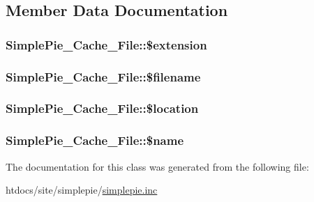 \subsection{Member Data Documentation}
\hypertarget{class_simple_pie___cache___file_a2628f1d1c5faca94a33734dd8315366a}{
\subsubsection[{\$extension}]{\setlength{\rightskip}{0pt plus 5cm}Simple\-Pie\-\_\-\-Cache\-\_\-\-File\-::\$extension}}\label{class_simple_pie___cache___file_a2628f1d1c5faca94a33734dd8315366a}
\hypertarget{class_simple_pie___cache___file_ab5834b498927e4e8743f2825b92ead52}{
\subsubsection[{\$filename}]{\setlength{\rightskip}{0pt plus 5cm}Simple\-Pie\-\_\-\-Cache\-\_\-\-File\-::\$filename}}\label{class_simple_pie___cache___file_ab5834b498927e4e8743f2825b92ead52}
\hypertarget{class_simple_pie___cache___file_a029b1cff8970d6b5ac7583edfd7eebfc}{
\subsubsection[{\$location}]{\setlength{\rightskip}{0pt plus 5cm}Simple\-Pie\-\_\-\-Cache\-\_\-\-File\-::\$location}}\label{class_simple_pie___cache___file_a029b1cff8970d6b5ac7583edfd7eebfc}
\hypertarget{class_simple_pie___cache___file_a9d2df32134a0be0680ceb63c61e38242}{
\subsubsection[{\$name}]{\setlength{\rightskip}{0pt plus 5cm}Simple\-Pie\-\_\-\-Cache\-\_\-\-File\-::\$name}}\label{class_simple_pie___cache___file_a9d2df32134a0be0680ceb63c61e38242}


The documentation for this class was generated from the following file\-:\begin{DoxyCompactItemize}
\item 
htdocs/site/simplepie/\hyperlink{simplepie_8inc}{simplepie.\-inc}\end{DoxyCompactItemize}
